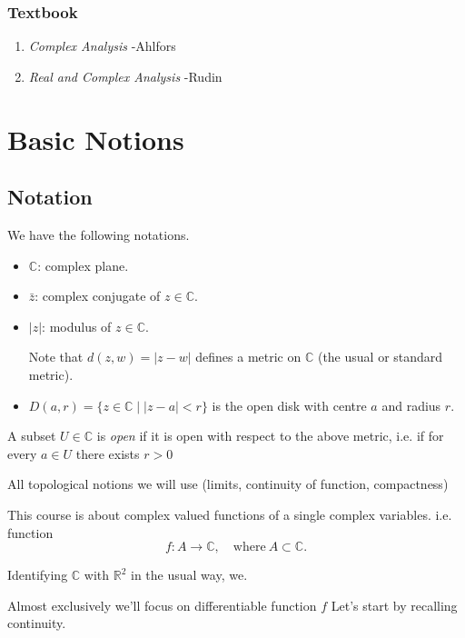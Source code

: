 \subsubsection*{Textbook}
\begin{enumerate}
    \item \textit{Complex Analysis} -Ahlfors
    \item \textit{Real and Complex Analysis} -Rudin
\end{enumerate}
\section{Basic Notions}
\subsection{Notation}
\begin{notation}
    We have the following notations.
    \begin{itemize}
        \item \(\mathbb{C}\): complex plane.
        \item \(\bar{z}\): complex conjugate of \(z \in \mathbb{C}\).
        \item \(\left\vert z \right\vert \): modulus of \(z \in \mathbb{C}\).

        Note that \(d(z, w) = \left\vert z - w \right\vert \) defines a metric on \(\mathbb{C}\) (the usual or standard metric).
        \item \(D(a, r) = \{z\in \mathbb{C}\mid \left\vert z - a \right\vert <r\}\) is the open disk with centre \(a\) and radius \(r\).
    \end{itemize}
\end{notation}
\begin{definition}
    A subset \(U \in \mathbb{C}\) is \textit{open} if it is open with respect to the above metric, i.e. if for every \(a \in U\) there exists \(r > 0\) 
\end{definition}
All topological notions we will use (limits, continuity of function, compactness)

This course is about complex valued functions of a single complex variables. i.e. function
\[
    f:A\to \mathbb{C},\quad \text{where}~ A\subset \mathbb{C}.
\]
\begin{remark}
    Identifying \(\mathbb{C}\) with \(\mathbb{R}^2\) in the usual way, we.
\end{remark}

Almost exclusively we'll focus on differentiable function \(f\) Let's start by recalling continuity.

